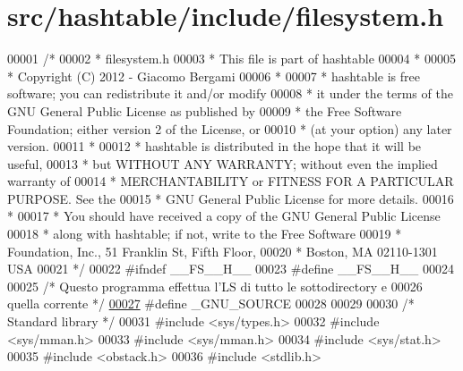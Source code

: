 \hypertarget{filesystem_8h_source}{
\section{src/hashtable/include/filesystem.h}
}

\begin{DoxyCode}
00001 \textcolor{comment}{/*}
00002 \textcolor{comment}{ * filesystem.h}
00003 \textcolor{comment}{ * This file is part of hashtable}
00004 \textcolor{comment}{ *}
00005 \textcolor{comment}{ * Copyright (C) 2012 - Giacomo Bergami}
00006 \textcolor{comment}{ *}
00007 \textcolor{comment}{ * hashtable is free software; you can redistribute it and/or modify}
00008 \textcolor{comment}{ * it under the terms of the GNU General Public License as published by}
00009 \textcolor{comment}{ * the Free Software Foundation; either version 2 of the License, or}
00010 \textcolor{comment}{ * (at your option) any later version.}
00011 \textcolor{comment}{ *}
00012 \textcolor{comment}{ * hashtable is distributed in the hope that it will be useful,}
00013 \textcolor{comment}{ * but WITHOUT ANY WARRANTY; without even the implied warranty of}
00014 \textcolor{comment}{ * MERCHANTABILITY or FITNESS FOR A PARTICULAR PURPOSE.  See the}
00015 \textcolor{comment}{ * GNU General Public License for more details.}
00016 \textcolor{comment}{ *}
00017 \textcolor{comment}{ * You should have received a copy of the GNU General Public License}
00018 \textcolor{comment}{ * along with hashtable; if not, write to the Free Software}
00019 \textcolor{comment}{ * Foundation, Inc., 51 Franklin St, Fifth Floor, }
00020 \textcolor{comment}{ * Boston, MA  02110-1301  USA}
00021 \textcolor{comment}{ */}
00022 \textcolor{preprocessor}{#ifndef \_\_FS\_\_H\_\_}
00023 \textcolor{preprocessor}{}\textcolor{preprocessor}{#define \_\_FS\_\_H\_\_}
00024 \textcolor{preprocessor}{}
00025 \textcolor{comment}{/* Questo programma effettua l'LS di tutto le sottodirectory e}
00026 \textcolor{comment}{   quella corrente */}
\hypertarget{filesystem_8h_source_l00027}{}\hyperlink{filesystem_8h_a369266c24eacffb87046522897a570d5}{00027} \textcolor{preprocessor}{#define \_GNU\_SOURCE}
00028 \textcolor{preprocessor}{}
00029 
00030 \textcolor{comment}{/*      Standard library        */}
00031 \textcolor{preprocessor}{#include        <sys/types.h>}
00032 \textcolor{preprocessor}{#include        <sys/mman.h>}
00033 \textcolor{preprocessor}{#include        <sys/mman.h>}
00034 \textcolor{preprocessor}{#include        <sys/stat.h>}
00035 \textcolor{preprocessor}{#include        <obstack.h>}
00036 \textcolor{preprocessor}{#include        <stdlib.h>}

\end{DoxyCode}
